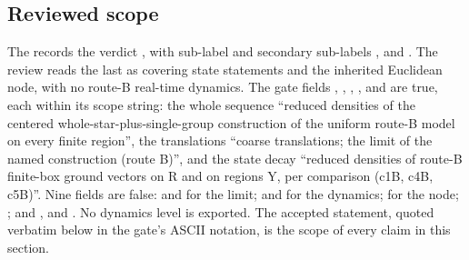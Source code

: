 \subsection{Reviewed scope}
\label{sec:bc2-scope}
The  records the
verdict , with sub-label
 and secondary sub-labels
,  and
. The review reads the last as covering state
statements and the inherited Euclidean node, with no route-B real-time
dynamics. The gate fields ,
, ,
,  and
 are true, each within its scope
string: the whole sequence ``reduced densities of the centered
whole-star-plus-single-group construction of the uniform route-B model on
every finite region'', the translations ``coarse translations; the limit of
the named construction (route B)'', and the state decay ``reduced densities
of route-B finite-box ground vectors on R and on regions Y, per comparison
(c1B, c4B, c5B)''. Nine fields are false:
 and 
for the limit;  and
 for the dynamics;
 for the node; ;
and ,  and
. No dynamics level is exported. The
accepted statement, quoted verbatim below in the gate's ASCII notation, is
the scope of every claim in this section.
